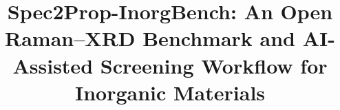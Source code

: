 \documentclass[pdflatex,sn-mathphys-num]{sn-jnl}
\begin{document}
\title{Spec2Prop-InorgBench: An Open Raman--XRD Benchmark and AI-Assisted Screening Workflow for Inorganic Materials}


\maketitle








\end{document}
